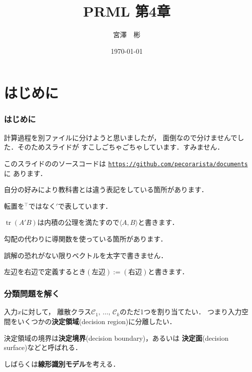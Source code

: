 \documentclass[10pt,%
hyperref={unicode}]{beamer}
\title{PRML 第4章}
\institute{総合研究大学院大学 博士前期1年\newline\newline\texttt{miyazawa-a@nii.ac.jp}}
\author{宮澤　彬}
\date{\today}
\DeclareMathOperator*{\tr}{tr}
\newenvironment{wideitemize}{\itemize\addtolength{\itemsep}{1em}}{\enditemize}
\begin{document}
\nocite{bishop2008}
\begin{frame}
\maketitle
\end{frame}

\section{はじめに}

\begin{frame}
    \frametitle{はじめに}
    \begin{wideitemize}
        \item 計算過程を別ファイルに分けようと思いましたが，
            面倒なので分けませんでした．そのためスライドが
            すこしごちゃごちゃしています．すみません．
        \item このスライドの{\LuaLaTeX}のソースコードは
            \href{https://github.com/pecorarista/documents}{\texttt{https://github.com/pecorarista/documents}}に
            あります．
        \item 自分の好みにより教科書とは違う表記をしている箇所があります．
            \begin{wideitemize}
                \item 転置を${}^\top$ではなく${}'$で表しています．
                \item $\tr (A'B)$は内積の公理を満たすので$\langle A, B\rangle$と書きます．
                \item 勾配の代わりに導関数を使っている箇所があります．
                \item 誤解の恐れがない限りベクトルを太字で書きません．
                \item 左辺を右辺で定義するとき$(\text{左辺}):=(\text{右辺})$と書きます．
            \end{wideitemize}
    \end{wideitemize}
\end{frame}

\begin{frame}
    \frametitle{分類問題を解く}
    入力$x$に対して，
    離散クラス$\mathcal{C}_1,\,\ldots,\,\mathcal{C}_k$のただ1つを割り当てたい．
    つまり入力空間をいくつかの\textbf{決定領域}(decision region)に分離したい．

    \bigskip

    決定領域の境界は\textbf{決定境界}(decision boundary)，あるいは
    \textbf{決定面}(decision surface)などと呼ばれる．

    \bigskip

    しばらくは\textbf{線形識別モデル}を考える．

\end{frame}
\end{document}
